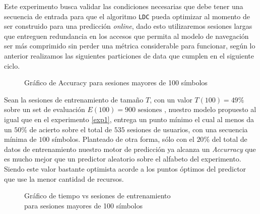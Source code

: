 Este experimento busca validar las condiciones necesarias que debe tener una secuencia de entrada para que el algoritmo \texttt{LDC} pueda optimizar al momento de ser construido para una predicción \emph{online}, dado esto utilizaremos sesiones largas que entreguen redundancia en los accesos que permita al modelo de navegación ser más comprimido sin perder una métrica considerable para funcionar, según lo anterior realizamos las siguientes particiones de data que cumplen en el siguiente ciclo. 
	
	\begin{figure}[h] 
		\centering
		\caption{Gráfico de Accuracy para sesiones mayores de 100 símbolos}
		\label{fig:sim}
	\end{figure}
	
	
	Sean la sesiones de entrenamiento de tamaño $T$, con un valor  $T(100) = 49 \% $ sobre un set de evaluación $E(100) = 900 \mbox{ sesiones}$ , nuestro modelo propuesto al igual que en el experimento \ref{exp1}, entrega un punto mínimo el cual al menos da un $50\%$ de acierto sobre el total de $535$ sesiones de usuarios, con una secuencia mínima de $100$ símbolos. Planteado de otra forma, sólo con el $20\%$ del total de datos de entrenamiento nuestro motor de predicción ya alcanza un \emph{Accurracy} que es mucho mejor que un predictor aleatorio sobre el alfabeto del experimento. Siendo este valor bastante optimista acorde a los puntos óptimos del predictor que use la menor cantidad de recursos.
	
	
	\begin{figure}[h] \label{fig:sim}
	\centering
		\caption{Gráfico de tiempo vs sesiones de entrenamiento\\ para sesiones mayores de 100 símbolos}
		
	\end{figure}


